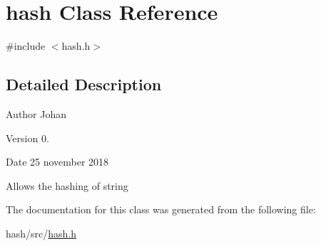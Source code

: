 \hypertarget{classhash}{}\section{hash Class Reference}
\label{classhash}


{\ttfamily \#include $<$hash.\+h$>$}



\subsection{Detailed Description}
\begin{DoxyAuthor}{Author}
Johan 
\end{DoxyAuthor}
\begin{DoxyVersion}{Version}
0. 
\end{DoxyVersion}
\begin{DoxyDate}{Date}
25 november 2018
\end{DoxyDate}
Allows the hashing of string 

The documentation for this class was generated from the following file\+:\begin{DoxyCompactItemize}
\item 
hash/src/\mbox{\hyperlink{hash_8h}{hash.\+h}}\end{DoxyCompactItemize}
